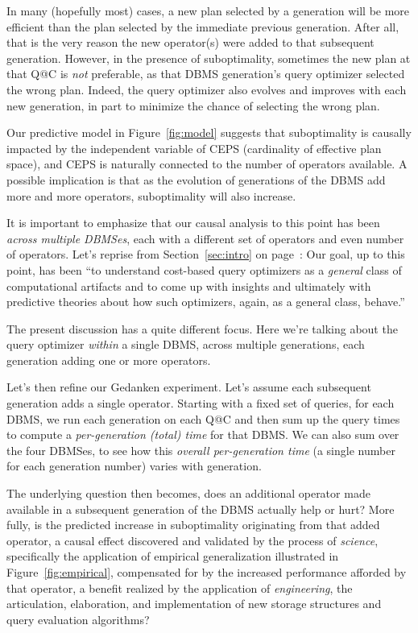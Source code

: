 \documentclass[prodmode,acmtods]{acmsmall}
\begin{document}
In many (hopefully most) cases, a new plan selected by a generation will be
more efficient than the plan selected by the immediate previous
generation. After all, that is the very reason the new operator(s) were
added to that subsequent generation.  However, in the presence of
suboptimality, sometimes the new plan at that Q@C is {\em not} preferable,
as that \hbox{DBMS} generation's query optimizer selected the wrong plan.
Indeed, the query optimizer also evolves and improves with each new
generation, in part to minimize the chance of selecting the wrong plan.

Our predictive model in Figure~\ref{fig:model} suggests that suboptimality is causally impacted by the
independent variable of CEPS (cardinality of effective plan space), and CEPS
is naturally connected to the number of operators available. A possible implication
is that as the evolution of generations of the \hbox{DBMS} add more and more
operators, suboptimality will also increase.

It is important to emphasize that our causal analysis to this point has been
{\em across multiple \hbox{DBMSes}}, each with a different set of
operators and even number of operators. Let's reprise from Section~\ref{sec:intro} on
page~\pageref{sec:intro}: Our goal, up to this point, has been ``to \hbox{understand} cost-based query
optimizers
as a {\em general} class of computational artifacts and to come up with
insights and ultimately with predictive theories about how such optimizers,
again, as a general class, behave.''

The present discussion has a quite different focus. Here we're talking about
the query optimizer {\em within} a single \hbox{DBMS}, across multiple
generations, each generation adding one or more operators.

Let's then refine our Gedanken experiment. Let's assume each subsequent
generation adds a single operator. Starting with a fixed set of queries,
for each DBMS, we run each generation on each Q@C and then sum up the query
times to compute a {\em per-generation (total) time} for that DBMS. We can
also sum over the four DBMSes, to see how this  {\em overall per-generation
  time} (a single number for each generation number) varies with generation.

The underlying question then becomes, does an additional operator made
available in a subsequent generation of the \hbox{DBMS} actually help or
hurt? More fully, is the predicted increase in suboptimality originating
from that added operator, a causal effect discovered and validated by the process
of {\em science}, specifically the application of \hbox{empirical} generalization illustrated
in Figure~\ref{fig:empirical}, compensated for by the increased performance
afforded by that operator, a benefit realized by the application of {\em
  engineering}, the articulation, elaboration, and implementation of new
storage structures and query evaluation algorithms?
\end{document}
